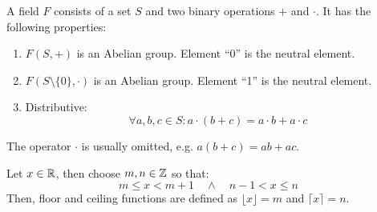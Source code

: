 \begin{definition}[Field]
    A field $F$ consists of a set $S$ and two binary operations $+$ and $\cdot$.
    It has the following properties:
    \begin{enumerate}
        \item $F(S,+)$ is an Abelian group. Element ``0'' is the neutral element.
        \item $F(S\setminus\{0\},\cdot)$ is an Abelian group. Element ``1'' is the neutral element.
        \item Distributive:
            \begin{equation}
                \forall a,b,c \in S: a \cdot (b + c) = a \cdot b + a \cdot c
            \end{equation}
    \end{enumerate}
    The operator $\cdot$ is usually omitted, e.g. $a (b + c) = ab + ac$.
\end{definition}

\begin{definition}
    Let $x \in \mathbb{R}$, then choose $m,n \in \mathbb{Z}$ so that:
    \begin{equation}
        m \le x < m + 1 \quad \land \quad n - 1 < x \le n
    \end{equation}
    Then, floor and ceiling functions are defined as 
    $\lfloor x \rfloor = m$ and 
    $\lceil x \rceil = n$.
\end{definition}


